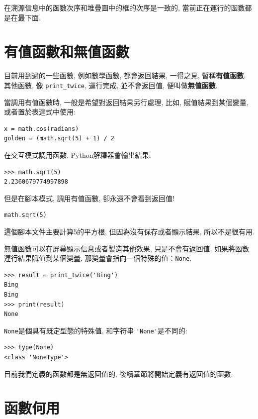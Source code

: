 \documentclass[10pt]{book}
\begin{document}
在溯源信息中的函數次序和堆疊圖中的框的次序是一致的, 
當前正在運行的函數都是在最下面. 

\section{有值函數和無值函數}

目前用到過的一些函數, 例如數學函數, 都會返回結果, 
一得之見, 暫稱{\bf 有值函數}. 其他函數, 像 \verb"print_twice", 
運行完成, 並不會返回值, 便叫做{\bf 無值函數}. 

當調用有值函數時, 一般是希望對返回結果另行處理, 比如, 
賦值結果到某個變量, 或者置於表達式中使用:

\begin{verbatim}
x = math.cos(radians)
golden = (math.sqrt(5) + 1) / 2
\end{verbatim}
%
在交互模式調用函數, Python解釋器會輸出結果:

\begin{verbatim}
>>> math.sqrt(5)
2.2360679774997898
\end{verbatim}
%
但是在腳本模式, 調用有值函數, 卻永遠不會看到返回值!

\begin{verbatim}
math.sqrt(5)
\end{verbatim}
%
這個腳本文件主要計算5的平方根, 但因為沒有保存或者顯示結果, 所以不是很有用. 

無值函數可以在屏幕顯示信息或者製造其他效果, 
只是不會有返回值. 如果將函數運行結果賦值到某個變量, 
那變量會指向一個特殊的值：{\tt None}.

\begin{verbatim}
>>> result = print_twice('Bing')
Bing
Bing
>>> print(result)
None
\end{verbatim}
%
{\tt None}是個具有既定型態的特殊值, 和字符串 \verb"'None'"是不同的:

\begin{verbatim}
>>> type(None)
<class 'NoneType'>
\end{verbatim}
%
目前我們定義的函數都是無返回值的, 後續章節將開始定義有返回值的函數. 


\section{函數何用}
\end{document}
